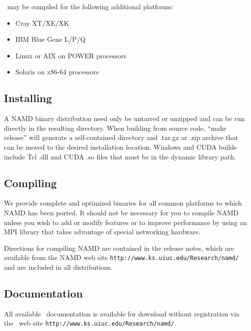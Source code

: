 \NAMD\ may be compiled for the following additional platforms:

\begin{itemize}
\item Cray XT/XE/XK
\item IBM Blue Gene L/P/Q
\item Linux or AIX on POWER processors
\item Solaris on x86-64 processors
\end{itemize}

\subsection{Installing \NAMD}

A NAMD binary distribution need only be untarred or unzipped and can
be run directly in the resulting directory.  When building from source
code, ``make release'' will generate a
self-contained directory and .tar.gz or .zip archive that can be moved
to the desired installation location.  Windows and CUDA builds include
Tcl .dll and CUDA .so files that must be in the dynamic library path.

\subsection{Compiling \NAMD}

We provide complete and optimized binaries for all
common platforms to which NAMD has been ported.
It should not be necessary for you to compile
NAMD unless you wish to add or modify features
or to improve performance by using an MPI library
that takes advantage of special networking hardware.

Directions for compiling NAMD are contained in the release notes,
which are available from the NAMD web site
{\tt http://www.ks.uiuc.edu/Research/namd/}
and are included in all distributions.

\subsection{Documentation}

All available \NAMD\ documentation is available for download without
registration via the \NAMD\ web site
{\tt http://www.ks.uiuc.edu/Research/namd/}.

